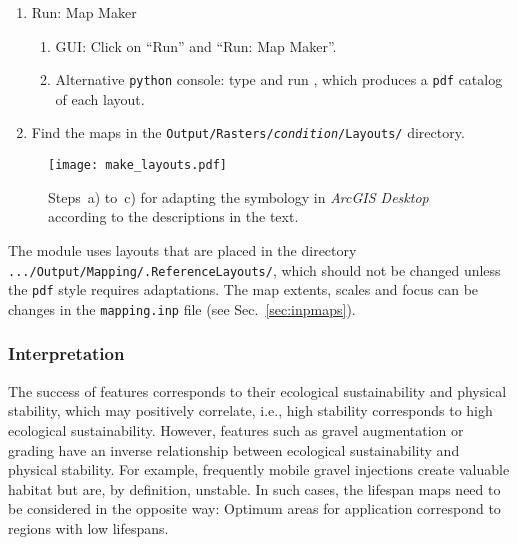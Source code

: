 \begin{enumerate}
	\begin{enumerate}%
		\item In the Table of Contents, double-click on the gray-scaled \texttt{temp} layer for accessing the \textit{Properties} window.
		\item Go to the \textit{Symbology} tab and click on ``Classified'' (computing histograms is required, if queried). Click on ``Import...'' button (folder symbol in the top-right corner) and select \texttt{lf{\myUnderscore}sym{\myUnderscore}ras} (for lifespan maps) or \texttt{ds{\myUnderscore}sym{\myUnderscore}ras} (for design maps).\\
		\textit{Hint: Some layouts contain on/off (``NoData+/1) values only. In these cases, ``Unique Values'' apply instead of ``Classified''.}
		\item Click OK and the gray layer should adapt its colors.
		\item Save and exit the \texttt{.mxd} file.
	\end{enumerate}
	\item Run: Map Maker
	\begin{enumerate}
	\item GUI: Click on ``Run'' and ``Run: Map Maker''.
	\item Alternative \texttt{python} console: type and run , which produces a \texttt{pdf} catalog of each layout.
	\end{enumerate}
	\item Find the maps in the \texttt{Output/Rasters/\textit{condition}/Layouts/} directory.
\end{enumerate}

\begin{figure}
	\centering
	\texttt{[image: make\_layouts.pdf]} %
	\caption{Steps~a) to~c) for adapting the symbology in \textit{ArcGIS Desktop} according to the descriptions in the text.\label{fig:make_layouts}}
\end{figure}

The module uses layouts that are placed in the directory \texttt{.../Output/Mapping/.ReferenceLayouts/}, which should not be changed unless the \texttt{pdf} style requires adaptations. The map extents, scales and focus can be changes in the \texttt{mapping.inp} file (see Sec.~\ref{sec:inpmaps}).

\subsubsection{Interpretation}
The success of features corresponds to their ecological sustainability and physical stability, which may positively correlate, i.e., high stability corresponds to high ecological sustainability. However, features such as gravel augmentation or grading have an inverse relationship between ecological sustainability and physical stability. For example, frequently mobile gravel injections create valuable habitat but are, by definition, unstable. In such cases, the lifespan maps need to be considered in the opposite way: Optimum areas for application correspond to regions with low lifespans.

